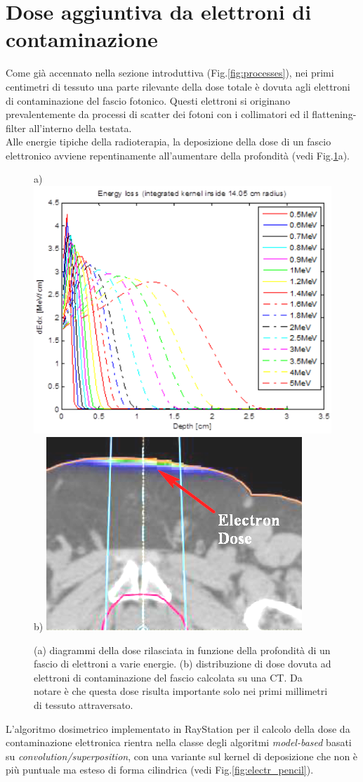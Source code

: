{\section{Dose aggiuntiva da elettroni di contaminazione}
\label{sec:dose_electr}
Come già accennato nella sezione introduttiva (Fig.\ref{fig:processes}), nei primi centimetri di tessuto una parte rilevante della dose totale è dovuta agli elettroni di contaminazione del fascio fotonico. Questi elettroni si originano prevalentemente da processi di scatter dei fotoni con i collimatori ed il flattening-filter all'interno della testata.\\
Alle energie tipiche della radioterapia, la deposizione della dose di un fascio elettronico avviene repentinamente all'aumentare della profondità (vedi Fig.\ref{fig:electr_enloss}a).
\begin{figure}
\centering
a) \includegraphics[width=.45\textwidth]{./cap1/electr_enloss.png}
b) \includegraphics[width=.44\textwidth]{./cap1/electr_doseCT_zoom.png}
\caption{(a) diagrammi della dose rilasciata in funzione della profondità di un fascio di elettroni a varie energie. (b) distribuzione di dose dovuta ad elettroni di contaminazione del fascio calcolata su una CT. Da notare è che questa dose risulta importante solo nei primi millimetri di tessuto attraversato.}
\label{fig:electr_enloss}
\end{figure}

L'algoritmo dosimetrico implementato in RayStation per il calcolo della dose da contaminazione elettronica rientra nella classe degli algoritmi \textit{model-based} basati su \textit{convolution/superposition}, con una variante sul kernel di deposizione che non è più puntuale ma esteso di forma cilindrica (vedi Fig.\ref{fig:electr_pencil}). 

}
